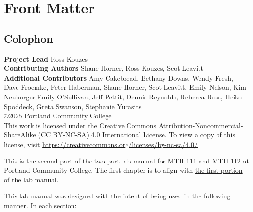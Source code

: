
\setcounter{chapter}{-1} 
\chapter{Front Matter}  \label{chapter-frontmatter}

\section*{Colophon}
{\bf Project Lead} Ross Kouzes\\[0.5em]
{\bf Contributing Authors} Shane Horner, Ross Kouzes, Scot Leavitt\\[0.5em]
{\bf Additional Contributors} Amy Cakebread, Bethany Downs, Wendy Fresh, Dave Froemke, Peter Haberman, Shane Horner, Scot Leavitt, Emily Nelson, Kim Neuburger,Emily O’Sullivan,  Jeff Pettit, Dennis Reynolds, Rebecca Ross, Heiko Spoddeck, Greta Swanson, Stephanie Yurasits \\[0.5em]
\copyright 2025 Portland Community College\\[0.5em]
This work is licensed under the Creative Commons Attribution-Noncommercial-ShareAlike (CC BY-NC-SA) 4.0 International License. To view a copy of this license, visit \href{CreativeCommons.org}{https://creativecommons.org/licenses/by-nc-sa/4.0/}\\


\newpage
\vspace{0.75in}

This is the second part of the two part lab manual for MTH 111 and MTH 112 at Portland Community College. The first chapter is  to align with \href{http://tiny.cc/111Z-Supplement}{the first portion of the lab manual}.

\vspace{0.5em}

This lab manual was designed with the intent of being used in the following manner.  In each section:

